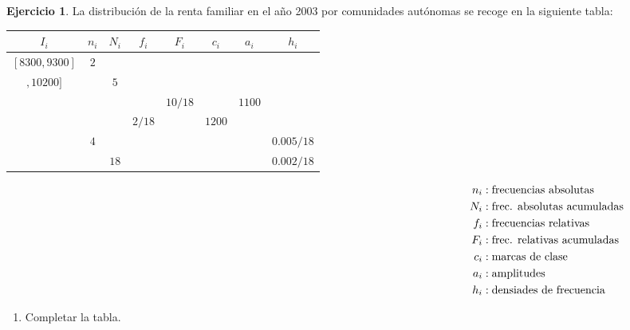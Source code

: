 \documentclass[a4paper, 12pt]{article}
\theoremstyle{definition}
\newtheorem{ej}{Ejercicio}
\begin{document}
\begin{ej}
La distribución de la renta familiar en el año 2003 por comunidades autónomas se recoge en la siguiente tabla:

\begin{table}[!h]

    \begin{tabular}{|c|c|c|c|c|c|c|c|}
    \hline
     \(I_i\) & \(n_i\) & \(N_i \) & \(f_i \) & \(F_i\) & \(c_i\) & \(a_i\) & \(h_i\)  \\ \hline
     \([8300, 9300] \) & \(2 \) & & & & & &\\ 
     \(,10200] \) & & \(5 \) & & & & & \\ 
     & & & & \(10/18 \)  & & \(1100 \) &   \\ 
     & & & \(2/18 \) & & \(1200 \) & &  \\ 
     & \(4 \) & & & & & & \(0.005/18\) \\ 
     & & \(18 \) & & & & & \(0.002/18\) \\ 
     \hline
    \end{tabular}
  
\vspace*{-130pt}
    \begin{align*}
   \hspace{12.5cm} 
    n_i&: \text{frecuencias absolutas }\\
    N_i&: \text{frec. absolutas acumuladas} \\
    f_i&: \text{frecuencias relativas} \\ 
    F_i&: \text{frec. relativas acumuladas} \\
    c_i&: \text{marcas de clase} \\
    a_i&: \text{amplitudes} \\
    h_i&: \text{densiades de frecuencia}
    \end{align*}
\end{table}

\begin{enumerate}[label=\textit{\alph*)}]
    \item Completar la tabla.
    

\end{enumerate}
\end{ej}
\end{document}
